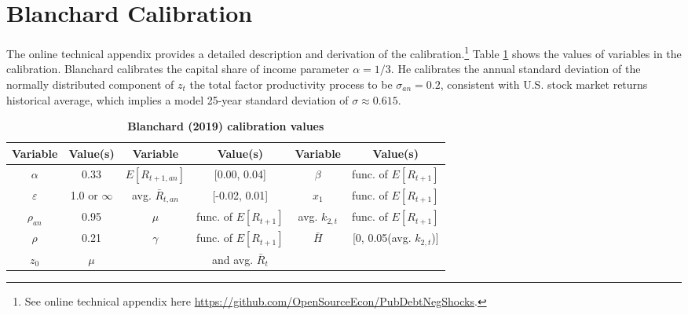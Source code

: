 \documentclass[letterpaper,12pt]{article}
\theoremstyle{definition}
\newcommand\ve{\varepsilon}
\begin{document}
\section{Blanchard Calibration}\label{SecCalib}

  The online technical appendix provides a detailed description and derivation of the calibration.\footnote{See online technical appendix here \href{https://github.com/OpenSourceEcon/PubDebtNegShocks}{https://github.com/OpenSourceEcon/PubDebtNegShocks}.} Table \ref{TabCalib} shows the values of variables in the \citet{Blanchard:2019} calibration. Blanchard calibrates the capital share of income parameter $\alpha=1/3$. He calibrates the annual standard deviation of the normally distributed component of $z_t$ the total factor productivity process to be $\sigma_{an}=0.2$, consistent with U.S. stock market returns historical average, which implies a model 25-year standard deviation of $\sigma\approx 0.615$.

  \begin{table}[htbp] \centering \captionsetup{width=6.0in}
  \caption{\label{TabCalib}\textbf{Blanchard (2019) calibration values}}
    \begin{threeparttable}
    \begin{tabular}{>{\small}c >{\small}c |>{\small}c >{\small}c |>{\small}c >{\small}c}
      \hline\hline
      Variable & Value(s) & Variable & Value(s) & Variable & Value(s) \\
      \hline
      $\alpha$ & 0.33 & $E[R_{t+1,an}]$ & [0.00, 0.04] & $\beta$ & func. of $E[R_{t+1}]$ \\
      $\ve$    & 1.0 or $\infty$ & avg. $\bar{R}_{t,an}$ & [-0.02, 0.01] & $x_1$ & func. of $E[R_{t+1}]$ \\
      $\rho_{an}$ & 0.95 & $\mu$ & func. of $E[R_{t+1}]$ & avg. $k_{2,t}$ & func. of $E[R_{t+1}]$ \\
      $\rho$ & 0.21 & $\gamma$ & func. of $E[R_{t+1}]$ & $\bar{H}$ & [0, 0.05(avg. $k_{2,t}$)] \\
      $z_0$ & $\mu$ & & and avg. $\bar{R}_{t}$ & & \\
      \hline\hline
    \end{tabular}
    \end{threeparttable}
  \end{table}
\end{document}
